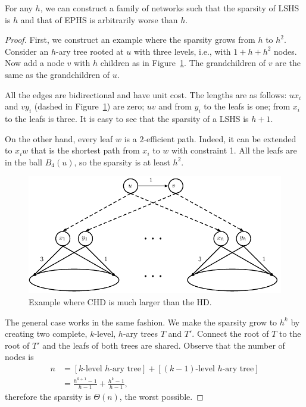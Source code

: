 \begin{proposition}\label{prop:treelike}
For any $h$, we can construct a family of networks such that the sparsity of LSHS is $h$ and that of EPHS is arbitrarily worse than $h$.
\end{proposition}
\begin{proof}
First, we construct an example where the sparsity grows from $h$ to $h^2$.
Consider an $h$-ary tree rooted at $u$ with three levels, i.e., with $1+h+h^2$ nodes.
Now add a node $v$ with $h$ children as in Figure~\ref{fig:treelike}. 
The grandchildren of $v$ are the same as the grandchildren of $u$.

All the edges are bidirectional and have unit cost.
The lengths are as follows: $ux_i$ and $vy_i$ (dashed in Figure~\ref{fig:treelike}) are zero; $uv$ and from $y_i$ to the leafs is one; from $x_i$ to the leafs is three.
It is easy to see that the sparsity of a LSHS is $h+1$.

On the other hand, every leaf $w$ is a $2$-efficient path.
Indeed, it can be extended to $x_iw$ that is the shortest path from $x_i$ to $w$ with constraint 1.
All the leafs are in the ball $B_4(u)$, so the sparsity is at least $h^2$.

\begin{figure}
\centering
\includegraphics[scale=0.5]{TexImg/Treelike.pdf}
\caption{Example where CHD is much larger than the HD.}\label{fig:treelike}
\end{figure}

The general case works in the same fashion.
We make the sparsity grow to $h^k$ by creating two complete, $k$-level, $h$-ary trees $T$ and $T'$.
Connect the root of $T$ to the root of $T'$ and the leafs of both trees are shared.
Observe that the number of nodes is 
\begin{align*}
n &=[\text{$k$-level $h$-ary tree}] + [\text{$(k-1)$-level $h$-ary tree}]\\
&= \frac{h^{k+1}-1}{h-1} + \frac{h^k-1}{h-1},
\end{align*}
therefore the sparsity is $\Theta(n)$, the worst possible.
\end{proof}
